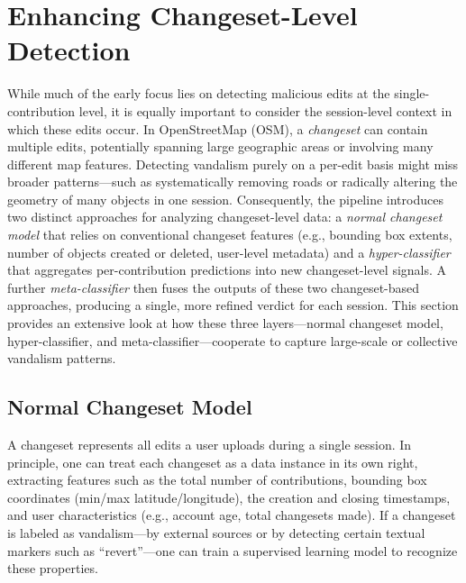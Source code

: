 \documentclass[
    13pt, %
    a4paper, %
    twoside, 
    DIV14, %
    listof=totoc, %
    bibliography=totoc, %
    index=totoc, %
    headsepline
]{scrreprt}
\begin{document}
\section{Enhancing Changeset-Level Detection}
\label{sec:changeset_level_detection}

While much of the early focus lies on detecting malicious edits at the single-contribution level, it is equally important to consider the session-level context in which these edits occur. In OpenStreetMap (OSM), a \emph{changeset} can contain multiple edits, potentially spanning large geographic areas or involving many different map features. Detecting vandalism purely on a per-edit basis might miss broader patterns—such as systematically removing roads or radically altering the geometry of many objects in one session. Consequently, the pipeline introduces two distinct approaches for analyzing changeset-level data: a \emph{normal changeset model} that relies on conventional changeset features (e.g., bounding box extents, number of objects created or deleted, user-level metadata) and a \emph{hyper-classifier} that aggregates per-contribution predictions into new changeset-level signals. A further \emph{meta-classifier} then fuses the outputs of these two changeset-based approaches, producing a single, more refined verdict for each session. This section provides an extensive look at how these three layers—normal changeset model, hyper-classifier, and meta-classifier—cooperate to capture large-scale or collective vandalism patterns.

\subsection{Normal Changeset Model}
\label{sec:normal_changeset_model}

A changeset represents all edits a user uploads during a single session. In principle, one can treat each changeset as a data instance in its own right, extracting features such as the total number of contributions, bounding box coordinates (min/max latitude/longitude), the creation and closing timestamps, and user characteristics (e.g., account age, total changesets made). If a changeset is labeled as vandalism—by external sources or by detecting certain textual markers such as “revert”—one can train a supervised learning model to recognize these properties.
\end{document}

